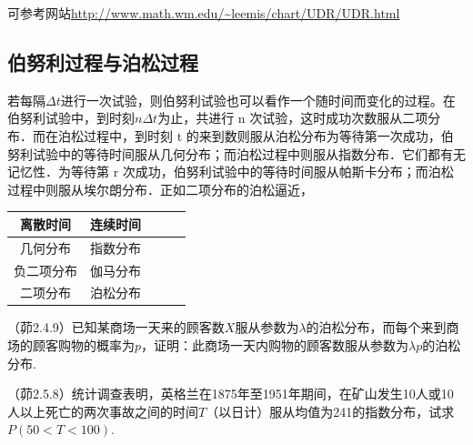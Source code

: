 可参考网站\url{http://www.math.wm.edu/~leemis/chart/UDR/UDR.html}

\subsection{伯努利过程与泊松过程}

若每隔$\Delta t$进行一次试验，则伯努利试验也可以看作一个随时间而变化的过程。在伯努利试验中，到时刻$n\Delta t$为止，共进行 n 次试验，这时成功次数服从二项分布．而在泊松过程中，到时刻 t 的来到数则服从泊松分布为等待第一次成功，伯努利试验中的等待时间服从几何分布；而泊松过程中则服从指数分布．它们都有无记忆性．为等待第 r 次成功，伯努利试验中的等待时间服从帕斯卡分布；而泊松过程中则服从埃尔朗分布．正如二项分布的泊松逼近，
\begin{table}[]
    \centering
    \begin{tabular}{ccccc}
        \toprule
        离散时间   & 连续时间 \\
        \midrule
        几何分布   & 指数分布 \\
        负二项分布 & 伽马分布 \\
        二项分布   & 泊松分布 \\
        \bottomrule
    \end{tabular}
\end{table}
\FloatBarrier

\begin{problemset}[错题记录]
    \item （茆2.4.9）已知某商场一天来的顾客数$X$服从参数为$\lambda$的泊松分布，而每个来到商场的顾客购物的概率为$p$，证明：此商场一天内购物的顾客数服从参数为$\lambda p$的泊松分布.
    \item （茆2.5.8）统计调查表明，英格兰在1875年至1951年期间，在矿山发生10人或10人以上死亡的两次事故之间的时间$T$（以日计）服从均值为241的指数分布，试求$P(50<T<100)$.
    \item
\end{problemset}

